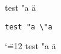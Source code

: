 \documentclass{article}
\begin{document}
test "a \"a
\begin{verbatim}
test "a \"a
\end{verbatim}

\begin{center}
\catcode`\"=12
test "a \"a
\end{center}
\end{document}

